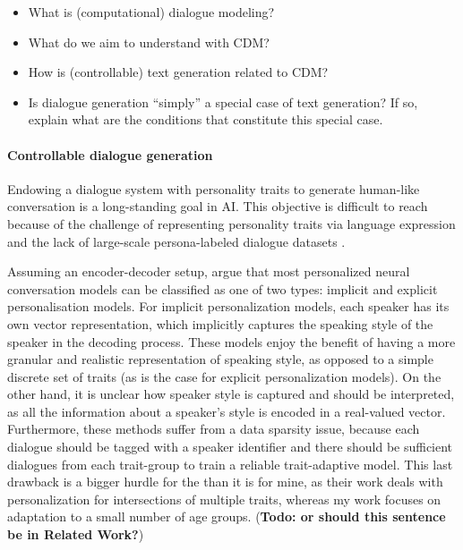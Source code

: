 \begin{itemize}
    \item What is (computational) dialogue modeling?
    \item What do we aim to understand with CDM?
    \item How is (controllable) text generation related to CDM?
    \item Is dialogue generation ``simply'' a special case of text generation? If so, explain what are the conditions that constitute this special case.
\end{itemize}

\paragraph{Controllable dialogue generation}

Endowing a dialogue system with personality traits to generate human-like conversation is a long-standing goal in AI. This objective is difficult to reach because of the challenge of representing personality traits via language expression and the lack of large-scale persona-labeled dialogue datasets \citep{zheng2019personalized}.

Assuming an encoder-decoder setup, \cite{zheng2019personalized} argue that most personalized neural conversation models can be classified as one of two types: implicit and explicit personalisation models. For implicit personalization models, each speaker has its own vector representation, which implicitly captures the speaking style of the speaker in the decoding process. These models enjoy the benefit of having a more granular and realistic representation of speaking style, as opposed to a simple discrete set of traits (as is the case for explicit personalization models). On the other hand, it is unclear how speaker style is captured and should be interpreted, as all the information about a speaker's style is encoded in a real-valued vector. Furthermore, these methods suffer from a data sparsity issue, because each dialogue should be tagged with a speaker identifier and there should be sufficient dialogues from each trait-group to train a reliable trait-adaptive model. This last drawback is a bigger hurdle for the \cite{zheng2019personalized} than it is for mine, as their work deals with personalization for intersections of multiple traits, whereas my work focuses on adaptation to a small number of age groups. (\textbf{Todo: or should this sentence be in Related Work?})

